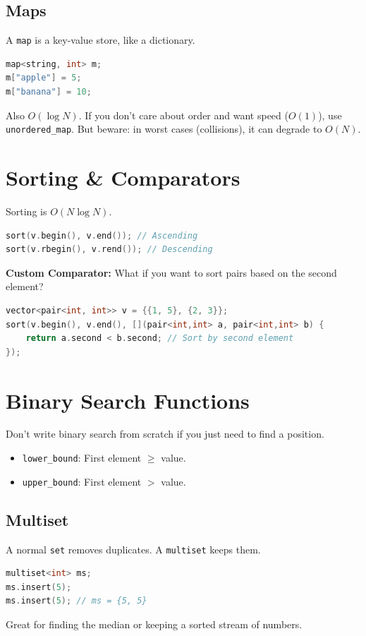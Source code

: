 \documentclass[12pt, a4paper]{report}
\begin{document}
\subsection{Maps}
A \texttt{map} is a key-value store, like a dictionary.
\begin{lstlisting}[language=C++]
map<string, int> m;
m["apple"] = 5;
m["banana"] = 10;
\end{lstlisting}
Also $O(\log N)$. If you don't care about order and want speed ($O(1)$), use \texttt{unordered\_map}. But beware: in worst cases (collisions), it can degrade to $O(N)$.

\section{Sorting \& Comparators}
Sorting is $O(N \log N)$.
\begin{lstlisting}[language=C++]
sort(v.begin(), v.end()); // Ascending
sort(v.rbegin(), v.rend()); // Descending
\end{lstlisting}

\textbf{Custom Comparator:} What if you want to sort pairs based on the second element?
\begin{lstlisting}[language=C++]
vector<pair<int, int>> v = {{1, 5}, {2, 3}};
sort(v.begin(), v.end(), [](pair<int,int> a, pair<int,int> b) {
    return a.second < b.second; // Sort by second element
});
\end{lstlisting}

\section{Binary Search Functions}
Don't write binary search from scratch if you just need to find a position.
\begin{itemize}
    \item \texttt{lower\_bound}: First element $\ge$ value.
    \item \texttt{upper\_bound}: First element $>$ value.
\end{itemize}

\subsection{Multiset}
A normal \texttt{set} removes duplicates. A \texttt{multiset} keeps them.
\begin{lstlisting}[language=C++]
multiset<int> ms;
ms.insert(5);
ms.insert(5); // ms = {5, 5}
\end{lstlisting}
Great for finding the median or keeping a sorted stream of numbers.
\end{document}
